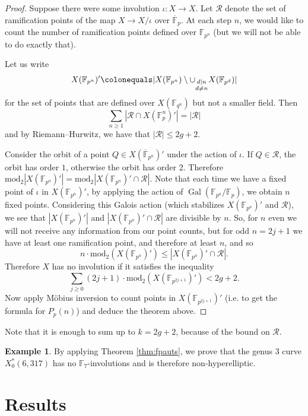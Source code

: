 \documentclass[12pt]{amsart}
\newcommand{\F}{\mathbb{F}}
\newcommand{\calR}{\mathcal{R}}
\DeclareMathOperator{\Gal}{Gal}
\numberwithin{equation}{subsection}
\theoremstyle{plain}\newtheorem{ithm}{Theorem}
\theoremstyle{plain}\newtheorem{iprop}[ithm]{Proposition}
\theoremstyle{definition}
\newtheorem{example}[equation]{Example}
\theoremstyle{remark}
\newcommand{\StarCurve}[2]{X_0^*({#1},{#2})} %
\begin{document}
\begin{proof}
Suppose there were some involution $\iota : X \to X$. Let $\calR$ denote the set of ramification points of the map $X \to X/\iota$ over $\overline{\F}_p$.  At each step $n$, we would like to count the number of ramification points defined over $\F_{p^n}$ (but we will not be able to do exactly that).


 Let us write
\[  X(\F_{p^n})' \colonequals | X(\F_{p^n}) \setminus   \cup_{\substack{d |n \\ d \neq n}} X(\F_{p^{d}}) |\]
for the set of points that are defined over $X(\F_{q^n})$ but not a smaller field.
Then
\[  \sum_{n \geq 1} |\calR \cap  X(\F_p^n)'| = |\calR|  \] and
by Riemann--Hurwitz, we have that $|\calR| \leq 2g+2.$



Consider the orbit of a point $Q \in X(\overline{\F}_{p^n})'$ under the action of $\iota$. If $Q \in \calR$, the orbit has order $1$, otherwise the orbit has order 2. Therefore $\mathrm{mod}_2 |X(\F_{p^n})' | = \mathrm{mod}_2|X(\F_{p^n})' \cap \calR | .$
Note that each time we have a fixed point of $\iota$ in $ X(\F_{p^n})'$, by applying the action of $\Gal(\F_{p^n} /\F_p)$, we obtain $n$ fixed points. Considering this Galois action (which stabilizes $ X(\F_{p^n})'$ and $\calR$), we see that $| X(\F_{p^n})'|$ and $| X(\F_{p^n})' \cap \calR|$ are divisible by $n$. So, for $n$ even we will not receive any information from our point counts, but for odd $n = 2j+1$ we have at least one ramification point, and therefore at least $n$, and so
 \[ n \cdot \mathrm{mod}_2(X(\F_{p^n})') \leq| X(\F_{p^n})' \cap \calR| .\]
Therefore  $X$ has no involution if it satisfies the inequality
\[  \sum_{j \geq 0} (2j+1) \cdot  \mathrm{mod}_2(X(\F_{p^{2j+1}})') < 2g+2 .\]
Now apply M\"obius inversion to count points in $X(\F_{p^{2j+1}})'$ (i.e. to get the formula for $P_p(n)$) and deduce the theorem above. 
\end{proof}
Note that it is enough to sum up to $k = 2g+2$, because of the bound on $\calR$.

\begin{example}
By applying Theorem \ref{thm:fpauts}, we prove that the genus 3 curve $\StarCurve{6}{317}$ has no $\F_7$-involutions and is therefore non-hyperelliptic.
\end{example}

\fi
\section{Results}
\label{sec:results}
\end{document}
